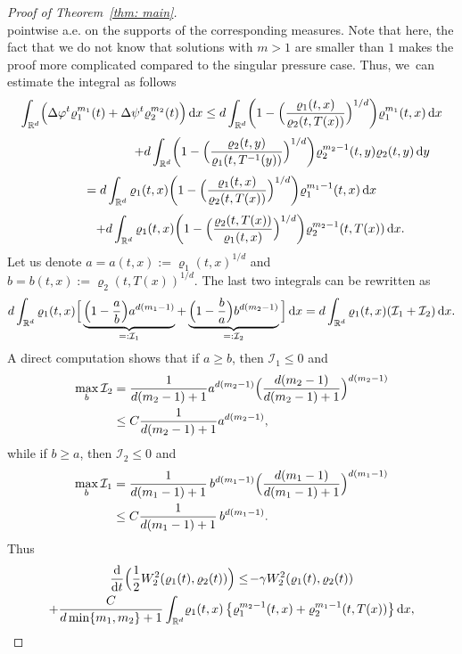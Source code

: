 \documentclass[11pt]{article}
\numberwithin{equation}{section}
\newcommand{\Bprt}[1]{\Bigl(#1\Bigr)}
\newcommand{\bbprt}[1]{\biggl(#1\biggr)}
\newcommand{\curlyI}{\mathcal{I}}
\newcommand{\dx}[1]{\mathop{}\!\mathrm{d} #1}
\newcommand{\ddt}{\frac{\dx{}}{\dx{t}}}
\newcommand{\R}{\mathbb{R}}
\theoremstyle{plain}
\theoremstyle{remark}
\begin{document}
\begin{proof}[Proof of Theorem~\ref{thm: main}]
\[\]
pointwise a.e. on the supports of the corresponding measures. Note that here, the fact that we do not know that solutions with $m>1$ are smaller than $1$ makes the proof more complicated compared to the singular pressure case.
Thus, we~can estimate the integral as follows
\begin{multline*}
\int_{\R^d} \Bprt{\Delta \varphi^t \varrho_1^{m_1}(t) +\Delta \psi^t \varrho_2^{m_2}(t) }\dx x
\leq d \int_{\R^d} \bbprt{1-\Bprt{\frac{\varrho_1(t,x)}{\varrho_2(t,T(x))}}^{1/d}} \varrho_1^{m_1}(t,x)\dx x \\[3pt]
\shoveright{+ d \int_{\R^d} \bbprt{1-\Bprt{\frac{\varrho_2(t,y)}{\varrho_1(t,T^{-1}(y))}}^{1/d}} \varrho_2^{m_2-1}(t,y) \varrho_2(t,y)\dx y}\\[3pt]
= d \int_{\R^d} \varrho_1(t,x) \bbprt{1-\Bprt{\frac{\varrho_1(t,x)}{\varrho_2(t,T(x))}}^{1/d}} \varrho_1^{m_1-1}(t,x) \dx x \\[3pt]
\qquad\quad + d\int_{\R^d}\varrho_1(t,x)\bbprt{1-\Bprt{\frac{\varrho_2(t,T(x))}{\varrho_1(t,x)}}^{1/d}} \varrho_2^{m_2-1}(t,T(x))\dx x.
\end{multline*}
Let us denote $a=a(t,x):= \varrho_1(t,x)^{1/d}$ and $b=b(t,x):=\varrho_2(t,T(x))^{1/d}$. The last two integrals can be rewritten as
\[
d \int_{\R^d} \varrho_1(t,x) \Big[\underbrace{\Bprt{1-\frac ab } a^{d(m_1-1)}}_{=:\curlyI_1} + \underbrace{\Bprt{1-\frac ba} b^{d(m_2-1)}}_{=:\curlyI_2}\Big]\dx x
= d \int_{\R^d} \varrho_1(t,x) (\curlyI_1 + \curlyI_2) \dx x.
\]
A direct computation shows that if $a\ge b$, then $\curlyI_1\le 0$ and
\begin{align*}
\max_b \curlyI_2 &= \frac{1}{d(m_2-1)+1} a^{d(m_2-1)} \Bigl(\frac{d(m_2-1)}{d(m_2-1)+1}\Bigr)^{d(m_2-1)} \\
&\leq C \frac{1}{d(m_2-1)+1}a^{d(m_2-1)},
\end{align*}
while if $b\ge a$, then $\curlyI_2\le 0$ and
\begin{align*}
\max_b \curlyI_1 &= \frac{1}{d(m_1-1)+1}\, b^{d(m_1-1)} \Bigl(\frac{d(m_1-1)}{d(m_1-1)+1}\Bigr)^{d(m_1-1)} \\
&\leq C \frac{1}{d(m_1-1)+1}\,b^{d(m_1-1)}.
\end{align*}
Thus
\begin{multline*}\label{intermediate}
\ddt\Bprt{\frac 12 W_2^2(\varrho_1(t), \varrho_2(t))}\leq \!- \gamma W_2^2(\varrho_1(t), \varrho_2(t))\\
+ \frac{C}{d\min\{m_1,m_2\}+1} \int_{\R^d}\! \varrho_1(t,x)\left\{\varrho_1^{m_2-1}(t,x)+\varrho_2^{m_1-1}(t,T(x))\right\}\dx x,
\end{multline*}

\end{proof}
\end{document}

